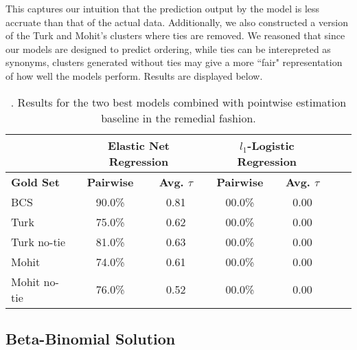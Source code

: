 This captures our intuition that the prediction output by the model is less accruate than that of the actual data. Additionally, we also constructed a version of the Turk and Mohit's clusters where ties are removed. We reasoned that since our models are designed to predict ordering, while ties can be interepreted as synonyms, clusters generated without ties may give a more ``fair" representation of how well the models perform. Results are displayed below. 

\begin{table}
\small
\centering
\begin{tabular}{|l|cc|cc|cc|}
	\hline 
	& \multicolumn{2}{c|}{Elastic Net Regression } 
	& \multicolumn{2}{c|}{$l_1$-Logistic Regression} \\
	\hline 
	\bf Gold Set
	& \bf Pairwise & \bf Avg. $\tau$  
	& \bf Pairwise & \bf Avg. $\tau$  \\ 
	\hline
	BCS          & 90.0\% & 0.81 & 00.0\%  &  0.00 \\
	Turk         & 75.0\% & 0.62 & 00.0\%  &  0.00 \\
	Turk no-tie  & 81.0\% & 0.63 & 00.0\%  &  0.00 \\
	Mohit        & 74.0\% & 0.61 & 00.0\%  &  0.00 \\
	Mohit no-tie & 76.0\% & 0.52 & 00.0\%  &  0.00 \\
	\hline
\end{tabular}
\caption{\label{font-table}. Results for the two best models combined with pointwise estimation baseline in the remedial fashion. }
\end{table}


\subsection{Beta-Binomial Solution}











